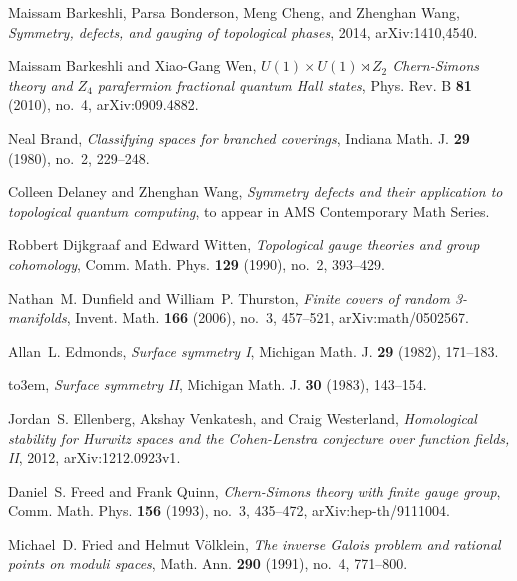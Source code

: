 \documentclass[10pt,twocolumn,amsmath,amssymb,aps,pra,secnumarabic,
    nofootinbib,groupedaddress]{revtex4-1}
\begin{document}
\providecommand{\bysame}{\leavevmode\hbox to3em{\hrulefill}\thinspace}
\providecommand{\href}[2]{#2}
\begin{thebibliography}{10}

Maissam Barkeshli, Parsa Bonderson, Meng Cheng, and Zhenghan Wang,
  \emph{Symmetry, defects, and gauging of topological phases}, 2014,
  {arXiv:1410,4540}.

Maissam Barkeshli and Xiao-Gang Wen, \emph{{$U(1)\times U(1) \rtimes Z_2$}
  {Chern-Simons} theory and {$Z_4$} parafermion fractional quantum {Hall}
  states}, Phys. Rev. B \textbf{81} (2010), no.~4, {arXiv:0909.4882}.

Neal Brand, \emph{Classifying spaces for branched coverings}, Indiana Math. J.
  \textbf{29} (1980), no.~2, 229--248.

Colleen Delaney and Zhenghan Wang, \emph{Symmetry defects and their application
  to topological quantum computing}, to appear in AMS Contemporary Math Series.

Robbert Dijkgraaf and Edward Witten, \emph{Topological gauge theories and group
  cohomology}, Comm. Math. Phys. \textbf{129} (1990), no.~2, 393--429.

Nathan~M. Dunfield and William~P. Thurston, \emph{Finite covers of random
  3-manifolds}, Invent. Math. \textbf{166} (2006), no.~3, 457--521,
  {arXiv:math/0502567}.

Allan~L. Edmonds, \emph{Surface symmetry {I}}, Michigan Math. J. \textbf{29}
  (1982), 171--183.

\bysame, \emph{Surface symmetry {II}}, Michigan Math. J. \textbf{30} (1983),
  143--154.

Jordan~S. Ellenberg, Akshay Venkatesh, and Craig Westerland, \emph{Homological
  stability for {Hurwitz} spaces and the {Cohen-Lenstra} conjecture over
  function fields, {II}}, 2012, {arXiv:1212.0923v1}.

Daniel~S. Freed and Frank Quinn, \emph{{Chern-Simons} theory with finite gauge
  group}, Comm. Math. Phys. \textbf{156} (1993), no.~3, 435--472,
  {arXiv:hep-th/9111004}.

Michael~D. Fried and Helmut V{\"o}lklein, \emph{The inverse {Galois} problem
  and rational points on moduli spaces}, Math. Ann. \textbf{290} (1991), no.~4,
  771--800.


\end{thebibliography}
\end{document}
